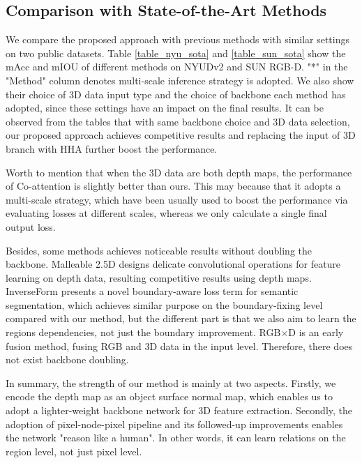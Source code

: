 ﻿\documentclass[journal]{IEEEtran}
\begin{document}
\subsection{Comparison with State-of-the-Art Methods}  
    We compare the proposed approach with previous methods with similar settings on two public datasets. Table \ref{table_nyu_sota} and \ref{table_sun_sota} show the mAcc and mIOU of different methods on NYUDv2 and SUN RGB-D. "*" in the "Method" column denotes multi-scale inference strategy is adopted. We also show their choice of 3D data input type and the choice of backbone each method has adopted, since these settings have an impact on the final results. It can be observed from the tables that with same backbone choice and 3D data selection, our proposed approach achieves competitive results and replacing the input of 3D branch with HHA further boost the performance. 
    
    Worth to mention that when the 3D data are both depth maps, the performance of Co-attention \cite{zhou2022canet} is slightly better than ours. This may because that it adopts a multi-scale strategy, which have been usually used to boost the performance via evaluating losses at different scales, whereas we only calculate a single final output loss. 
    
    Besides, some methods achieves noticeable results without doubling the backbone. Malleable 2.5D \cite{2020malleable} designs delicate convolutional operations for feature learning on depth data, resulting competitive results using depth maps. InverseForm \cite{borse2021inverseform} presents a novel boundary-aware loss term for semantic segmentation, which achieves similar purpose on the boundary-fixing level compared with our method, but the different part is that we also aim to learn the regions dependencies, not just the boundary improvement. RGB$\times$D \cite{cao2021rgbxd} is an early fusion method, fusing RGB and 3D data in the input level. Therefore, there does not exist backbone doubling. 
    
    In summary, the strength of our method is mainly at two aspects. Firstly, we encode the depth map as an object surface normal map, which enables us to adopt a lighter-weight backbone network for 3D feature extraction. Secondly, the adoption of pixel-node-pixel pipeline and its followed-up improvements enables the network "reason like a human". In other words, it can learn relations on the region level, not just pixel level.
\end{document}
